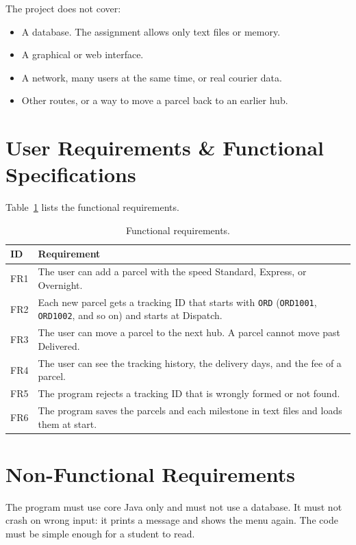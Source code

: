 The project does not cover:
\begin{itemize}
\item A database. The assignment allows only text files or memory.
\item A graphical or web interface.
\item A network, many users at the same time, or real courier data.
\item Other routes, or a way to move a parcel back to an earlier hub.
\end{itemize}

\section{User Requirements \& Functional Specifications}
Table~\ref{tab:requirements} lists the functional requirements.

\begin{table}[h]
\centering
\caption{Functional requirements.}
\label{tab:requirements}
\renewcommand{\arraystretch}{1.3}
\begin{tabularx}{\textwidth}{|p{}|X|}
\hline
\textbf{ID} & \textbf{Requirement}\\
\hline
FR1 & The user can add a parcel with the speed Standard, Express, or Overnight.\\
\hline
FR2 & Each new parcel gets a tracking ID that starts with \texttt{ORD} (\texttt{ORD1001}, \texttt{ORD1002}, and so on) and starts at Dispatch.\\
\hline
FR3 & The user can move a parcel to the next hub. A parcel cannot move past Delivered.\\
\hline
FR4 & The user can see the tracking history, the delivery days, and the fee of a parcel.\\
\hline
FR5 & The program rejects a tracking ID that is wrongly formed or not found.\\
\hline
FR6 & The program saves the parcels and each milestone in text files and loads them at start.\\
\hline
\end{tabularx}
\end{table}

\section{Non-Functional Requirements}
The program must use core Java only and must not use a database. It must not
crash on wrong input: it prints a message and shows the menu again. The code
must be simple enough for a student to read.
